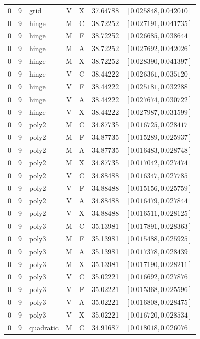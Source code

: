 \begin{longtable}{r r l c c r l}
0 & 9 & grid & V & X & 37.64788 & $[0.025848,0.042010]$ \\
0 & 9 & hinge & M & C & 38.72252 & $[0.027191,0.041735]$ \\
0 & 9 & hinge & M & F & 38.72252 & $[0.026685,0.038644]$ \\
0 & 9 & hinge & M & A & 38.72252 & $[0.027692,0.042026]$ \\
0 & 9 & hinge & M & X & 38.72252 & $[0.028390,0.041397]$ \\
0 & 9 & hinge & V & C & 38.44222 & $[0.026361,0.035120]$ \\
0 & 9 & hinge & V & F & 38.44222 & $[0.025181,0.032288]$ \\
0 & 9 & hinge & V & A & 38.44222 & $[0.027674,0.030722]$ \\
0 & 9 & hinge & V & X & 38.44222 & $[0.027987,0.031599]$ \\
0 & 9 & poly2 & M & C & 34.87735 & $[0.016725,0.028417]$ \\
0 & 9 & poly2 & M & F & 34.87735 & $[0.015289,0.025937]$ \\
0 & 9 & poly2 & M & A & 34.87735 & $[0.016483,0.028748]$ \\
0 & 9 & poly2 & M & X & 34.87735 & $[0.017042,0.027474]$ \\
0 & 9 & poly2 & V & C & 34.88488 & $[0.016347,0.027785]$ \\
0 & 9 & poly2 & V & F & 34.88488 & $[0.015156,0.025759]$ \\
0 & 9 & poly2 & V & A & 34.88488 & $[0.016479,0.027844]$ \\
0 & 9 & poly2 & V & X & 34.88488 & $[0.016511,0.028125]$ \\
0 & 9 & poly3 & M & C & 35.13981 & $[0.017891,0.028363]$ \\
0 & 9 & poly3 & M & F & 35.13981 & $[0.015488,0.025925]$ \\
0 & 9 & poly3 & M & A & 35.13981 & $[0.017378,0.028439]$ \\
0 & 9 & poly3 & M & X & 35.13981 & $[0.017190,0.028211]$ \\
0 & 9 & poly3 & V & C & 35.02221 & $[0.016692,0.027876]$ \\
0 & 9 & poly3 & V & F & 35.02221 & $[0.015368,0.025596]$ \\
0 & 9 & poly3 & V & A & 35.02221 & $[0.016808,0.028475]$ \\
0 & 9 & poly3 & V & X & 35.02221 & $[0.016720,0.028534]$ \\
0 & 9 & quadratic & M & C & 34.91687 & $[0.018018,0.026076]$ \\

\end{longtable}
